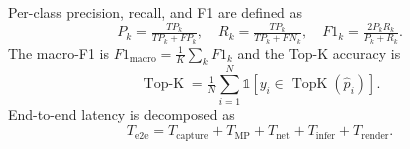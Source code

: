 Per-class precision, recall, and F1 are defined as
\begin{equation}
  P_k = \tfrac{TP_k}{TP_k + FP_k},\quad
  R_k = \tfrac{TP_k}{TP_k + FN_k},\quad
  F1_k = \tfrac{2 P_k R_k}{P_k + R_k}.
\end{equation}
The macro-F1 is $F1_{\text{macro}} = \tfrac{1}{K}\sum_k F1_k$ and the
Top-K accuracy is
\begin{equation}
  \operatorname{Top-K} = \tfrac{1}{N} \sum_{i=1}^{N}
   \mathbb{1}\!\left[ y_i \in \operatorname{TopK}(\hat p_i) \right].
\end{equation}
End-to-end latency is decomposed as
\begin{equation}
  T_{\text{e2e}} = T_{\text{capture}} + T_{\text{MP}} + T_{\text{net}}
                 + T_{\text{infer}} + T_{\text{render}}.
\end{equation}
